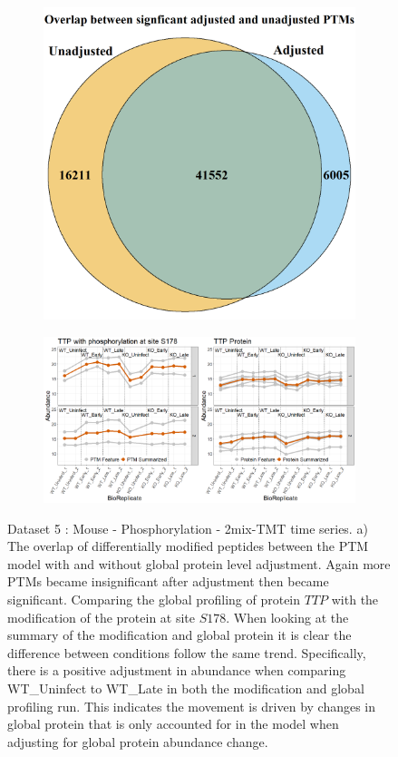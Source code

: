 \documentclass[mcp]{article}
\numberwithin{table}{section}
\begin{document}
\begin{figure}[h!]
\centering
\begin{subfigure}{\textwidth}
 \centering
\includegraphics[height=.5\textwidth]{images/shig_venn_diagramm.png}
\caption{}
 \end{subfigure}
 \begin{subfigure}{\textwidth}
 \centering
	\includegraphics[width=1.0\textwidth]{images/No_Difference_Shigella_Profile_Plot}
	\caption{}
	 \end{subfigure}
\caption{Dataset 5 : Mouse - Phosphorylation - 2mix-TMT time series. a) The overlap of differentially modified peptides between the PTM model with and without global protein level adjustment. Again more PTMs became insignificant after adjustment then became significant. Comparing the global profiling of protein $TTP$ with the modification of the protein at site $S178$. When looking at the summary of the modification and global protein it is clear the difference between conditions follow the same trend. Specifically, there is a positive adjustment in abundance when comparing WT\_Uninfect to WT\_Late in both the modification and global profiling run. This indicates the movement is driven by changes in global protein that is only accounted for in the model when adjusting for global protein abundance change.}
\label{fig:shigella_plots}
\end{figure}
\end{document}
